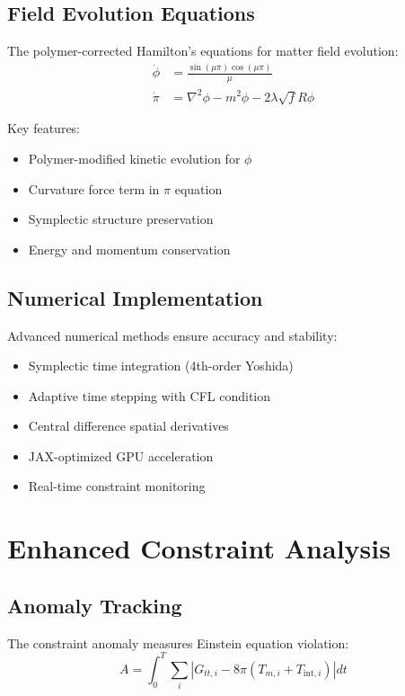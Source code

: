 \documentclass[11pt]{article}
\begin{document}
\subsection{Field Evolution Equations}

The polymer-corrected Hamilton's equations for matter field evolution:
\begin{align}
\dot{\phi} &= \frac{\sin(\mu\pi)\cos(\mu\pi)}{\mu} \\
\dot{\pi} &= \nabla^2\phi - m^2\phi - 2\lambda\sqrt{f}R\phi
\end{align}

Key features:
\begin{itemize}
\item Polymer-modified kinetic evolution for $\phi$
\item Curvature force term in $\pi$ equation
\item Symplectic structure preservation
\item Energy and momentum conservation
\end{itemize}

\subsection{Numerical Implementation}

Advanced numerical methods ensure accuracy and stability:
\begin{itemize}
\item Symplectic time integration (4th-order Yoshida)
\item Adaptive time stepping with CFL condition
\item Central difference spatial derivatives
\item JAX-optimized GPU acceleration
\item Real-time constraint monitoring
\end{itemize}

\section{Enhanced Constraint Analysis}

\subsection{Anomaly Tracking}

The constraint anomaly measures Einstein equation violation:
\begin{equation}
A = \int_0^T \sum_i |G_{tt,i} - 8\pi(T_{m,i} + T_{\text{int},i})| dt
\end{equation}
\end{document}
